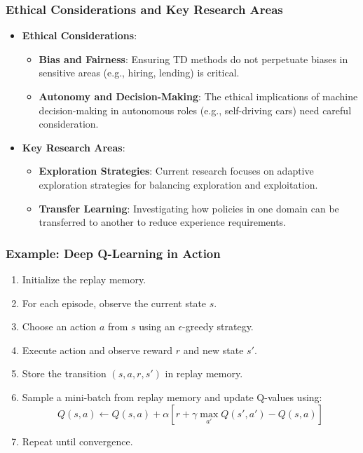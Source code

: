 \documentclass[aspectratio=169]{beamer}
\begin{document}
\begin{frame}[fragile]
    \frametitle{Ethical Considerations and Key Research Areas}
    \begin{itemize}
        \item \textbf{Ethical Considerations}:
        \begin{itemize}
            \item \textbf{Bias and Fairness}: Ensuring TD methods do not perpetuate biases in sensitive areas (e.g., hiring, lending) is critical.
            \item \textbf{Autonomy and Decision-Making}: The ethical implications of machine decision-making in autonomous roles (e.g., self-driving cars) need careful consideration.
        \end{itemize}
        
        \item \textbf{Key Research Areas}:
        \begin{itemize}
            \item \textbf{Exploration Strategies}: Current research focuses on adaptive exploration strategies for balancing exploration and exploitation.
            \item \textbf{Transfer Learning}: Investigating how policies in one domain can be transferred to another to reduce experience requirements.
        \end{itemize}
    \end{itemize}
\end{frame}

\begin{frame}[fragile]
    \frametitle{Example: Deep Q-Learning in Action}
    \begin{enumerate}
        \item Initialize the replay memory.
        \item For each episode, observe the current state \( s \).
        \item Choose an action \( a \) from \( s \) using an \(\epsilon\)-greedy strategy.
        \item Execute action and observe reward \( r \) and new state \( s' \).
        \item Store the transition \((s, a, r, s')\) in replay memory.
        \item Sample a mini-batch from replay memory and update Q-values using:
        \begin{equation}
            Q(s, a) \leftarrow Q(s, a) + \alpha \left[ r + \gamma \max_{a'} Q(s', a') - Q(s, a) \right]
        \end{equation}
        \item Repeat until convergence.
    \end{enumerate}
\end{frame}
\end{document}
